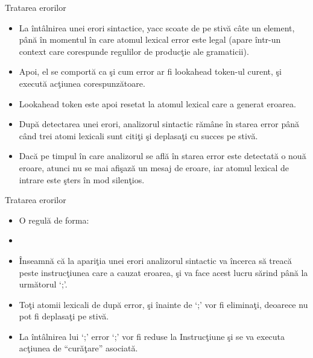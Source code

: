 \documentclass[pdf]{beamer}
\begin{document}
\begin{frame}{Tratarea erorilor}
\begin{itemize}
	\item
	La întâlnirea unei erori sintactice, yacc scoate de pe stivă câte un element, până în momentul în care atomul lexical {\color{red}error} este legal (apare într-un context care corespunde regulilor de producţie ale gramaticii).

	\item
	Apoi, el se comportă ca şi cum error ar fi lookahead token-ul curent, şi execută acţiunea corespunzătoare.

	\item
	Lookahead token este apoi resetat la atomul lexical care a generat eroarea.

	\item
	După detectarea unei erori, analizorul sintactic rămâne în starea error până când trei atomi lexicali sunt citiţi şi deplasaţi cu succes pe stivă.

	\item
	Dacă pe timpul în care analizorul se află în starea error este detectată o nouă eroare, atunci nu se mai afişază un mesaj de eroare, iar atomul lexical de intrare este şters în mod silenţios.

\end{itemize}
\end{frame}



\begin{frame}{Tratarea erorilor}
\begin{itemize}
	\item
	O regulă de forma:

	\item[]

	\item
	Înseamnă că la apariţia unei erori analizorul sintactic va încerca să treacă peste instrucţiunea care a cauzat eroarea, şi va face acest lucru sărind până la următorul ‘;’.

	\item
	Toţi atomii lexicali de după error, şi înainte de ‘;’ vor fi eliminaţi, deoarece nu pot fi deplasaţi pe stivă.

	\item
	La întâlnirea lui ‘;’ {\color{red}error ‘;’} vor fi reduse la {\color{red}Instrucţiune} şi se va executa acţiunea de “curăţare” asociată.

\end{itemize}
\end{frame}
\end{document}
